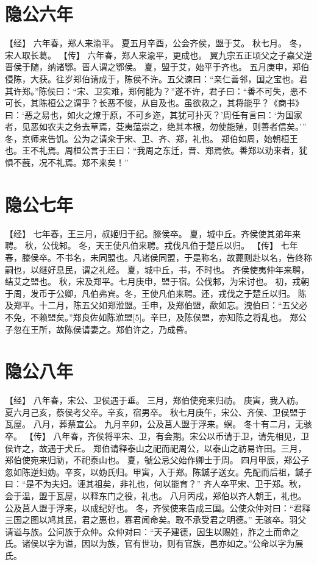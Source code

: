 \documentclass[a4paper,12pt,UTF8,twoside]{ctexbook}
\begin{document}
\chapter{隐公六年}

【经】
六年春，郑人来渝平。
夏五月辛酉，公会齐侯，盟于艾。
秋七月。
冬，宋人取长葛。
【传】
六年春，郑人来渝平，更成也。
翼九宗五正顷父之子嘉父逆晋侯于随，纳诸鄂。晋人谓之鄂侯。
夏，盟于艾，始平于齐也。
五月庚申，郑伯侵陈，大获。往岁郑伯请成于，陈侯不许。五父谏曰：“亲仁善邻，国之宝也。君其许郑。”陈侯曰：“宋、卫实难，郑何能为？”遂不许，君子曰：“善不可失，恶不可长，其陈桓公之谓乎？长恶不悛，从自及也。虽欲救之，其将能乎？《商书》曰：‘恶之易也，如火之燎于原，不可乡迩，其犹可扑灭？’周任有言曰：‘为国家者，见恶如农夫之务去草焉，芟夷蕰崇之，绝其本根，勿使能殖，则善者信矣。’”
冬，京师来告饥。公为之请籴于宋、卫、齐、郑，礼也。
郑伯如周，始朝桓王也。王不礼焉。周桓公言于王曰：“我周之东迁，晋、郑焉依。善郑以劝来者，犹惧不蔇，况不礼焉。郑不来矣！”

\chapter{隐公七年}

【经】
七年春，王三月，叔姬归于纪。滕侯卒。
夏，城中丘。齐侯使其弟年来聘。
秋，公伐邾。
冬，天王使凡伯来聘。戎伐凡伯于楚丘以归。
【传】
七年春，滕侯卒。不书名，未同盟也。凡诸侯同盟，于是称名，故薨则赴以名，告终称嗣也，以继好息民，谓之礼经。
夏，城中丘，书，不时也。
齐侯使夷仲年来聘，结艾之盟也。
秋，宋及郑平。七月庚申，盟于宿。公伐邾，为宋讨也。
初，戎朝于周，发币于公卿，凡伯弗宾。冬，王使凡伯来聘。还，戎伐之于楚丘以归。
陈及郑平。十二月，陈五父如郑涖盟。壬申，及郑伯盟，歃如忘。洩伯曰：“五父必不免，不赖盟矣。”郑良佐如陈涖盟[5]。辛巳，及陈侯盟，亦知陈之将乱也。
郑公子忽在王所，故陈侯请妻之。郑伯许之，乃成昏。

\chapter{隐公八年}

【经】
八年春，宋公、卫侯遇于垂。
三月，郑伯使宛来归祊。
庚寅，我入祊。
夏六月己亥，蔡侯考父卒。辛亥，宿男卒。
秋七月庚午，宋公、齐侯、卫侯盟于瓦屋。
八月，葬蔡宣公。
九月辛卯，公及莒人盟于浮来。螟。
冬十有二月，无骇卒。
【传】
八年春，齐侯将平宋、卫，有会期。宋公以币请于卫，请先相见，卫侯许之，故遇于犬丘。
郑伯请释泰山之祀而祀周公，以泰山之祊易许田。三月，郑伯使宛来归祊，不祀泰山也。
夏，虢公忌父始作卿士于周。
四月甲辰，郑公子忽如陈逆妇妫。辛亥，以妫氏归。甲寅，入于郑。陈鍼子送女。先配而后祖，鍼子曰：“是不为夫妇。诬其祖矣，非礼也，何以能育？”
齐人卒平宋、卫于郑。秋，会于温，盟于瓦屋，以释东门之役，礼也。
八月丙戌，郑伯以齐人朝王，礼也。
公及莒人盟于浮来，以成纪好也。
冬，齐侯使来告成三国。公使众仲对曰：“君释三国之图以鸠其民，君之惠也，寡君闻命矣。敢不承受君之明德。”
无骇卒。羽父请谥与族。公问族于众仲。众仲对曰：“天子建德，因生以赐姓，胙之土而命之氏。诸侯以字为谥，因以为族，官有世功，则有官族，邑亦如之。”公命以字为展氏。
\end{document}
